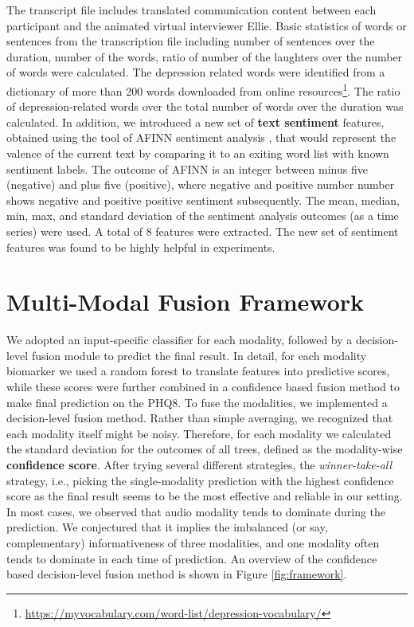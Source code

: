\documentclass[letterpaper]{article} %
\begin{document}
The transcript file includes translated communication content between each participant and the animated virtual interviewer Ellie. Basic statistics of words or sentences from the transcription file including number of sentences over the duration, number of the words, ratio of number of the laughters over the number of words were calculated. The depression related words were identified from a dictionary of more than 200 words downloaded from online resources\footnote{\url{https://myvocabulary.com/word-list/depression-vocabulary/}}. The ratio of depression-related words over the total number of words over the duration was calculated.  In addition, we introduced a new set of \textbf{text sentiment} features, obtained using the tool of AFINN sentiment analysis \cite{nielsen2011new}, that would represent the valence of the current text by comparing it to an exiting word list with known sentiment labels. The outcome of AFINN is an integer between minus five (negative) and plus five (positive), where negative and positive number number shows negative and positive positive sentiment subsequently. The mean, median, min, max, and standard deviation of the sentiment analysis outcomes (as a time series) were used. A total of 8 features were extracted. The new set of sentiment features was found to be highly helpful in experiments.

\vspace{-3.10mm}
\section{Multi-Modal Fusion Framework}

We adopted an input-specific classifier for each modality, followed by a decision-level fusion module to predict the final result. In detail, for each modality biomarker we used a random forest to translate features into predictive scores, while these scores were further combined in a confidence based fusion method to make final prediction on the PHQ8. To fuse the modalities, we implemented a decision-level fusion method. Rather than simple averaging, we recognized that each modality itself might be noisy. Therefore, for each modality we calculated the standard deviation for the outcomes of all trees, defined as the modality-wise \textbf{confidence score}. After trying several different strategies, the \textit{winner-take-all} strategy, i.e., picking the single-modality prediction with the highest confidence score as the final result seems to be the most effective and reliable in our setting. In most cases, we observed that audio modality tends to dominate during the prediction. We conjectured that it implies the imbalanced (or say, complementary) informativeness of three modalities, and one modality often tends to dominate in each time of prediction. An overview of the confidence based decision-level fusion method is shown in Figure \ref{fig:framework}.
\end{document}
